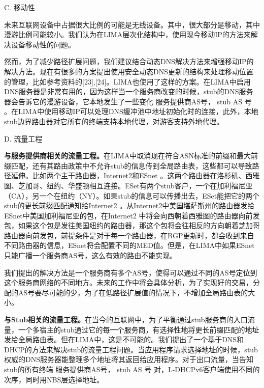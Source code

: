 \begin{flushleft}
C.	移动性
\end{flushleft}
\par 未来互联网设备中占据很大比例的可能是无线设备。其中，很大部分是移动，其中漫游比例可能较小。我们认为在LIMA层次化结构中，使用现今移动IP的方法来解决设备移动性的问题。
\par 然而，为了减少路径扩展问题，我们建议结合动态DNS解决方法来增强移动IP的解决方法。现在有很多的方案提出使用安全动态DNS更新的结构来处理移动位置的管理，比如参考资料的[23],[24]。LIMA也使用了这样的方案。在LIMA中启用DNS服务器是非常有用的，因为这样当一个服务商改变的时候，stub的DNS服务器会告诉它的漫游设备，它本地发生了一些变化{ 服务提供商AS号， stub AS 号 }。在LIMA中使用移动IP可以处理DNS缓冲池中地址初始化时的连接，此外，本地stub边界路由器对它所有的终端支持本地代理，对游客支持外地代理。
\begin{flushleft}
D.	流量工程
\par \textbf{与服务提供商相关的流量工程。}在LIMA中取消现在符合ASN标准的前缀和最大前缀匹配，还有其路由政策中不允许stub的信息传到全局路由表，这些都可以导致路径延伸。比如两个主干路由器，Internet2和ESnet 。这两个路由器在洛杉矶、西雅图、芝加哥、纽约、华盛顿相互连接。ESet有两个stub客户，一个在加利福尼亚（CA），另一个在纽约（NY）。如果stub的信息可以传播出去，ESet能把它的两个stub的更长前缀匹配通知给Internet2 。从Internet2中美国堪萨斯州的路由器发给ESnet中美国加利福尼亚的包，在Internet2 中将会向西朝着西雅图的路由器向前发包，如果这个包是发往美国纽约的路由器，那这个包将会往相反的方向朝着芝加哥路由器向前发包，前提条件是对于每一个路由器，在BGP更新时，都会收到来自不同路由器的信息，ESnet将会配置不同的MED值。但是，在LIMA中如果ESnet只能广播一个服务商AS号，这么有效的路由不能实现。
\end{flushleft}
\par 我们提出的解决方法是一个服务商有多个AS号，使得可以通过不同的AS号定位到这个服务商网络的不同地方。未来的工作中将会具体分析，为了实现好的交易，分配的AS号要尽可能的少，为了在低路径扩展值的情况下，不增加全局路由表的大小。
\begin{flushleft}
\par \textbf{与Stub相关的流量工程。}在当今的互联网中，为了平衡通过stub服务商的入口流量，一个多宿主的stub通过它的每一个服务商，有选择性地将更长前缀匹配的地址发给全局路由表。但在LIMA中，这是不可能的。我们提出了一个基于DNS和DHCP的方法来解决stub的流量工程问题。当应用程序请求选择地址的时候，stub权威的DNS服务器能整理多个地址将其返回给应用程序。对于出口流量，当告知stub的所有终端{ 服务提供商AS号， stub AS 号 }对，L-DHCPv6客户端使用不同的次序，同时用NBS层选择地址。
\end{flushleft}
